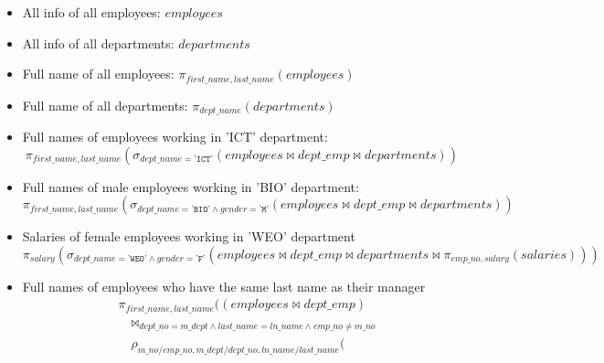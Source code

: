 \documentclass{assignment}
\begin{document}
\begin{itemize}[nolistsep]
    \item All info of all employees: $\mathit{employees}$
    \item All info of all departments: $\mathit{departments}$
    \item Full name of all employees: $\pi_{\mathit{first\_name},
        \mathit{last\_name}}(\mathit{employees})$
    \item Full name of all departments:
        $\pi_{\mathit{dept\_name}}(\mathit{departments})$
    \item Full names of employees working in 'ICT' department:
        \[\pi_{\mathit{first\_name},
            \mathit{last\_name}}(\sigma_{\mathit{dept\_name} =
                \texttt{'ICT'}}(\mathit{employees} \bowtie
        \mathit{dept\_emp} \bowtie \mathit{departments}))\]
    \item Full names of male employees working in 'BIO' department:
        \[\pi_{\mathit{first\_name},
            \mathit{last\_name}}(\sigma_{\mathit{dept\_name} =
                    \texttt{'BIO'} \land \mathit{gender} =
                \texttt{'M'}}(\mathit{employees} \bowtie
        \mathit{dept\_emp} \bowtie \mathit{departments}))\]
    \item Salaries of female employees working in 'WEO' department
        \[\pi_{\mathit{salary}}(\sigma_{\mathit{dept\_name} =
                    \texttt{'WEO'} \land \mathit{gender} =
                \texttt{'F'}}(\mathit{employees} \bowtie
                    \mathit{dept\_emp} \bowtie
                    \mathit{departments} \bowtie
        \pi_{\mathit{emp\_no}, \mathit{salary}}(\mathit{salaries})))\]
    \item Full names of employees who have the same last name as their manager
        \begin{equation*}
            \begin{split}
                &\pi_{\mathit{first\_name}, \mathit{last\_name}} \Big(
                    (\mathit{employees} \bowtie \mathit{dept\_emp}) \\
                    &\quad\bowtie_{\mathit{dept\_no} = \mathit{m\_dept}
                        \land \mathit{last\_name} = \mathit{ln\_name}
                    \land \mathit{emp\_no} \neq \mathit{m\_no}} \\
                    &\quad\rho_{\mathit{m\_no}/\mathit{emp\_no},
                        \mathit{m\_dept}/\mathit{dept\_no},
                    \mathit{ln\_name}/\mathit{last\_name}}
                    \big( \\

\end{split}
\end{equation*}
\end{itemize}
\end{document}
